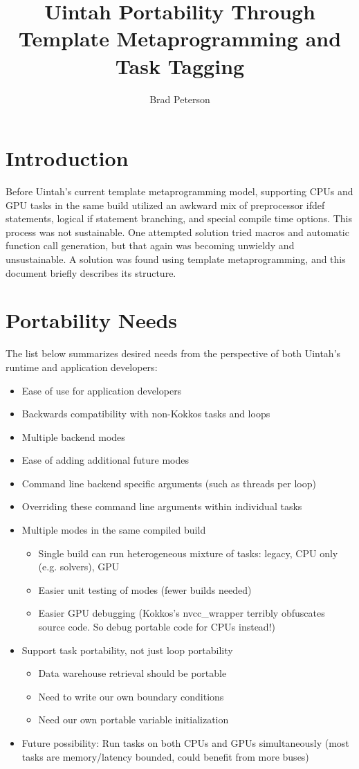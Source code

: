 \documentclass[]{article}
\title{Uintah Portability Through Template Metaprogramming and Task Tagging}
\author{Brad Peterson}
\begin{document}
\maketitle
\section{Introduction}

Before Uintah's current template metaprogramming model, supporting CPUs and GPU tasks in the same build utilized an awkward mix of preprocessor ifdef statements, logical if statement branching, and special compile time options.  This process was not sustainable.  One attempted solution tried macros and automatic function call generation, but that again was becoming unwieldy and unsustainable.  A solution was found using template metaprogramming, and this document briefly describes its structure.

\section{Portability Needs}
\label{sec:portability_needs}
The list below summarizes desired needs from the perspective of both Uintah's runtime and application developers:

\begin{itemize}
\item Ease of use for application developers
\item Backwards compatibility with non-Kokkos tasks and loops
\item Multiple backend modes
\item Ease of adding additional future modes
\item Command line backend specific arguments (such as threads per loop)
\item Overriding these command line arguments within individual tasks
\item Multiple modes in the same compiled build
\begin{itemize}
\item Single build can run heterogeneous mixture of tasks: legacy, CPU only (e.g. solvers), GPU
\item Easier unit testing of modes (fewer builds needed)
\item Easier GPU debugging (Kokkos's nvcc\_wrapper terribly obfuscates source code.  So debug portable code for CPUs instead!)
\end{itemize}
\item Support task portability, not just loop portability
\begin{itemize}
\item Data warehouse retrieval should be portable
\item Need to write our own boundary conditions
\item Need our own portable variable initialization
\end{itemize}
\item Future possibility: Run tasks on both CPUs and GPUs simultaneously (most tasks are memory/latency bounded, could benefit from more buses)
\end{itemize}
\end{document}
